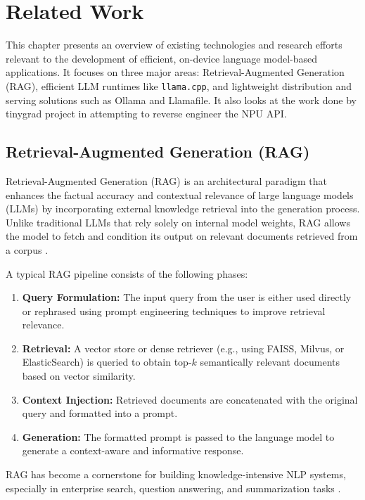 \chapter{Related Work}

This chapter presents an overview of existing technologies and research efforts relevant to the development of efficient, on-device language model-based applications. It focuses on three major areas: Retrieval-Augmented Generation (RAG), efficient LLM runtimes like \texttt{llama.cpp}, and lightweight distribution and serving solutions such as Ollama and Llamafile. It also looks at the work done by tinygrad project in attempting to reverse engineer the NPU API.


\section{Retrieval-Augmented Generation (RAG)}
\label{sec:RAG}

Retrieval-Augmented Generation (RAG) is an architectural paradigm that enhances the factual accuracy and contextual relevance of large language models (LLMs) by incorporating external knowledge retrieval into the generation process. Unlike traditional LLMs that rely solely on internal model weights, RAG allows the model to fetch and condition its output on relevant documents retrieved from a corpus \cite{lewis2021retrieval}.

A typical RAG pipeline consists of the following phases:

\begin{enumerate}
    \item \textbf{Query Formulation:} The input query from the user is either used directly or rephrased using prompt engineering techniques to improve retrieval relevance.
    \item \textbf{Retrieval:} A vector store or dense retriever (e.g., using FAISS, Milvus, or ElasticSearch) is queried to obtain top-$k$ semantically relevant documents based on vector similarity.
    \item \textbf{Context Injection:} Retrieved documents are concatenated with the original query and formatted into a prompt.
    \item \textbf{Generation:} The formatted prompt is passed to the language model to generate a context-aware and informative response.
\end{enumerate}

RAG has become a cornerstone for building knowledge-intensive NLP systems, especially in enterprise search, question answering, and summarization tasks \cite{rag_blog, langchain_rag}.


